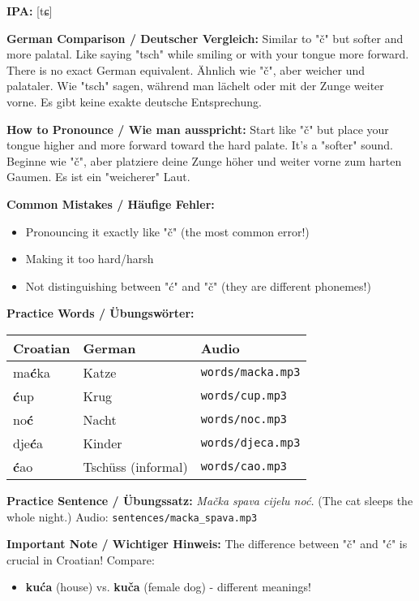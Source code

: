 \begin{tcolorbox}[colback=lightblue!30, colframe=croatianblue, title=\textbf{Ć, ć}]

\textbf{IPA:} [tɕ]

\textbf{German Comparison / Deutscher Vergleich:}
Similar to "č" but softer and more palatal. Like saying "tsch" while smiling or with your tongue more forward. There is no exact German equivalent.
Ähnlich wie "č", aber weicher und palataler. Wie "tsch" sagen, während man lächelt oder mit der Zunge weiter vorne. Es gibt keine exakte deutsche Entsprechung.

\textbf{How to Pronounce / Wie man ausspricht:}
Start like "č" but place your tongue higher and more forward toward the hard palate. It's a "softer" sound.
Beginne wie "č", aber platziere deine Zunge höher und weiter vorne zum harten Gaumen. Es ist ein "weicherer" Laut.

\textbf{Common Mistakes / Häufige Fehler:}
\begin{itemize}
    \item Pronouncing it exactly like "č" (the most common error!)
    \item Making it too hard/harsh
    \item Not distinguishing between "ć" and "č" (they are different phonemes!)
\end{itemize}

\textbf{Practice Words / Übungswörter:}
\begin{tabular}{lll}
\textbf{Croatian} & \textbf{German} & \textbf{Audio} \\
\midrule
ma\textbf{ć}ka & Katze & \texttt{words/macka.mp3} \\
\textbf{ć}up & Krug & \texttt{words/cup.mp3} \\
no\textbf{ć} & Nacht & \texttt{words/noc.mp3} \\
dje\textbf{ć}a & Kinder & \texttt{words/djeca.mp3} \\
\textbf{ć}ao & Tschüss (informal) & \texttt{words/cao.mp3} \\
\end{tabular}

\textbf{Practice Sentence / Übungssatz:}
\textit{Mačka spava cijelu noć.}
(The cat sleeps the whole night.)
Audio: \texttt{sentences/macka\_spava.mp3}

\textbf{Important Note / Wichtiger Hinweis:}
The difference between "č" and "ć" is crucial in Croatian! Compare:
\begin{itemize}
    \item \textbf{kuća} (house) vs. \textbf{kuča} (female dog) - different meanings!
\end{itemize}

\end{tcolorbox}

